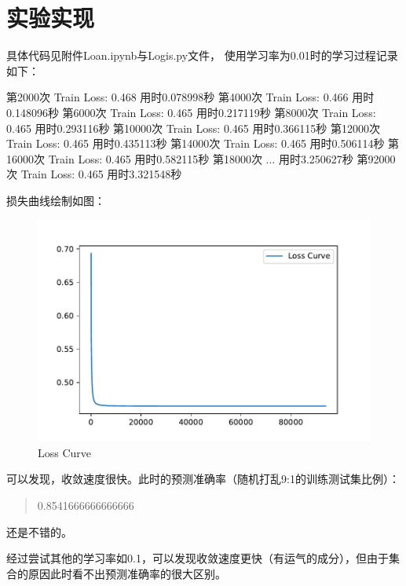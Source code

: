 \documentclass[UTF8,a4paper,AutoFakeBold,AutoFakeSlant]{article}
\begin{document}
\section{实验实现}
具体代码见附件Loan.ipynb与Logis.py文件，
使用学习率为0.01时的学习过程记录如下：
\begin{python}
  第2000次
	Train Loss: 0.468 
用时0.078998秒
第4000次
	Train Loss: 0.466 
用时0.148096秒
第6000次
	Train Loss: 0.465 
用时0.217119秒
第8000次
	Train Loss: 0.465 
用时0.293116秒
第10000次
	Train Loss: 0.465 
用时0.366115秒
第12000次
	Train Loss: 0.465 
用时0.435113秒
第14000次
	Train Loss: 0.465 
用时0.506114秒
第16000次
	Train Loss: 0.465 
用时0.582115秒
第18000次
...
用时3.250627秒
第92000次
	Train Loss: 0.465 
用时3.321548秒
\end{python}
损失曲线绘制如图：
\begin{figure}[htbp]
  \centering
  \includegraphics[scale=0.625]{loss.pdf}
  \caption{Loss Curve}
  \label{f1}
\end{figure}
可以发现，收敛速度很快。此时的预测准确率（随机打乱9:1的训练测试集比例）：
\begin{quote}
  0.8541666666666666
\end{quote}
还是不错的。

经过尝试其他的学习率如0.1，可以发现收敛速度更快（有运气的成分），但由于集合的原因此时看不出预测准确率的很大区别。






















% 
% 
% 
\end{document}
